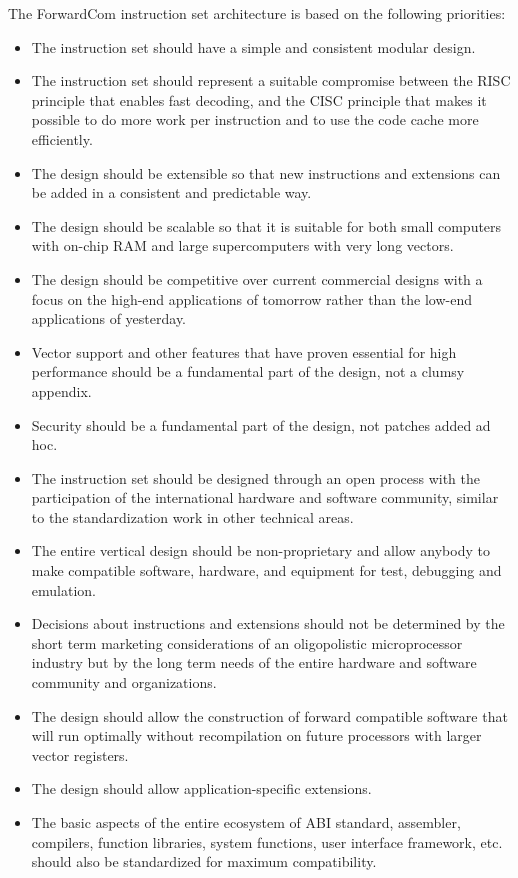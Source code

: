 \documentclass[forwardcom.tex]{subfiles}
\begin{document}
The ForwardCom instruction set architecture is based on the following priorities:
\begin{itemize}
\item The instruction set should have a simple and consistent modular design.
\item The instruction set should represent a suitable compromise between the RISC principle that enables fast decoding, and the CISC principle that makes it possible to do more work per instruction and to use the code cache more efficiently.
\item The design should be extensible so that new instructions and extensions can be added in a consistent and predictable way.
\item The design should be scalable so that it is suitable for both small computers with on-chip RAM and large supercomputers with very long vectors.
\item The design should be competitive over current commercial designs with a focus on the high-end applications of tomorrow rather than the low-end applications of yesterday.
\item Vector support and other features that have proven essential for high performance should be a fundamental part of the design, not a clumsy appendix.
\item Security should be a fundamental part of the design, not patches added ad hoc.
\item The instruction set should be designed through an open process with the participation of the international hardware and software community, similar to the standardization work in other technical areas.
\item The entire vertical design should be non-proprietary and allow anybody to make compatible software, hardware, and equipment for test, debugging and emulation.
\item Decisions about instructions and extensions should not be determined by the short term marketing considerations of an oligopolistic microprocessor industry but by the long term needs of the entire hardware and software community and organizations.
\item The design should allow the construction of forward compatible software that will run optimally without recompilation on future processors with larger vector registers.
\item The design should allow application-specific extensions.
\item The basic aspects of the entire ecosystem of ABI standard, assembler, compilers, function libraries, system functions, user interface framework, etc. should also be standardized for maximum compatibility.
\end{itemize}
\end{document}
